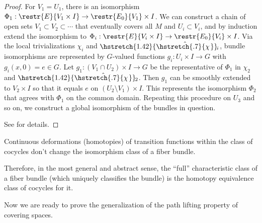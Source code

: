 \documentclass[english,letterpaper]{article}%
\numberwithin{equation}{section}
\numberwithin{figure}{section}
\numberwithin{table}{section}
\theoremstyle{definition}
\theoremstyle{definition}
\theoremstyle{definition}
\theoremstyle{plain}
\theoremstyle{plain}
\theoremstyle{plain}
\theoremstyle{plain}
\theoremstyle{remark}
\theoremstyle{remark}
\newcommand\wh[1]{\hstretch{1.42}{\hat{\hstretch{.7}{#1\mkern2mu}}}\mkern-2mu} %
\begin{document}
\begin{proof}
    For $V_1=U_1$, there is an isomorphism $\Phi_1:\restr{E}{V_1\times I}\to\restr{E_0}{V_1}\times I$. We can construct a chain of open sets $V_1\subset V_2\subset\cdots$ that eventually covers all $M$ and $U_i\subset V_i$, and by induction extend the isomorphism to $\Phi_i:\restr{E}{V_i\times I}\to\restr{E_0}{V_i}\times I$. Via the local trivializations $\chi_i$ and $\wh{\chi}_i$, bundle isomorphisms are represented by $G$-valued functions $g_i:U_{i}\times I\to G$ with $g_i(x,0)=e\in G$. Let $g_1:(V_1\cap U_2)\times I\to G$ be the representative of $\Phi_1$ in $\chi_2$ and $\wh{\chi}_2$. Then $g_1$ can be smoothly extended to $V_2\times I$ so that it equals $e$ on $(U_2\setminus V_1)\times I$. This represents the isomorphism $\Phi_2$ that agrees with $\Phi_1$ on the common domain. Repeating this procedure on $U_3$ and so on, we construct a global isomorphism of the bundles in question.

    See \cite[Thm. 3.3.1]{RS2} for details.
\end{proof}

\begin{cor}
    Continuous deformations (homotopies) of transition functions within the class of cocycles don't change the isomorphism class of a fiber bundle.
\end{cor}

Therefore, in the most general and abstract sense, the ``full'' characteristic class of a fiber bundle (which uniquely classifies the bundle) is the homotopy equivalence class of cocycles for it.

Now we are ready to prove the generalization of the path lifting property of covering spaces.
\end{document}
